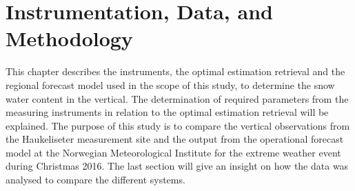 \chapter{Instrumentation, Data, and Methodology}\label{ch:Methods}
This chapter describes the instruments, the optimal estimation retrieval and the regional forecast model used in the scope of this study, to determine the snow water content in the vertical. The determination of required parameters from the measuring instruments in relation to the optimal estimation retrieval will be explained. The purpose of this study is to compare the vertical observations from the Haukeliseter measurement site and the output from the operational forecast model at the Norwegian Meteorological Institute for the extreme weather event during Christmas 2016. 
The last section will give an insight on how the data was analysed to compare the different systems. 


\newpage





